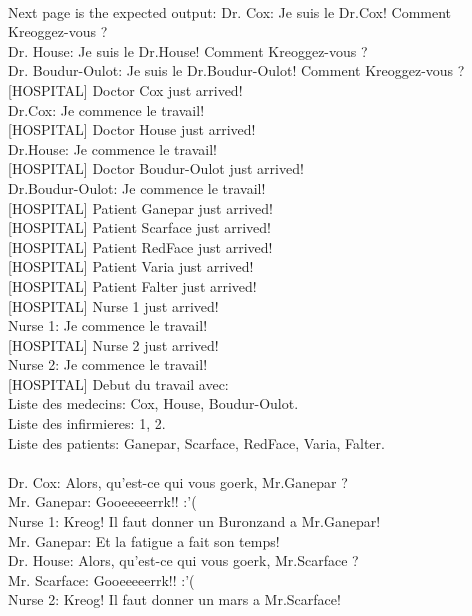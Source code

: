 ~\\
Next page is the expected output:
\newpage
{}
{
  Dr. Cox: Je suis le Dr.Cox! Comment Kreoggez-vous ?\\
  Dr. House: Je suis le Dr.House! Comment Kreoggez-vous ?\\
  Dr. Boudur-Oulot: Je suis le Dr.Boudur-Oulot! Comment Kreoggez-vous ?\\
  {[HOSPITAL]} Doctor Cox just arrived!\\
  Dr.Cox: Je commence le travail!\\
  {[HOSPITAL]} Doctor House just arrived!\\
  Dr.House: Je commence le travail!\\
  {[HOSPITAL]} Doctor Boudur-Oulot just arrived!\\
  Dr.Boudur-Oulot: Je commence le travail!\\
  {[HOSPITAL]} Patient Ganepar just arrived!\\
  {[HOSPITAL]} Patient Scarface just arrived!\\
  {[HOSPITAL]} Patient RedFace just arrived!\\
  {[HOSPITAL]} Patient Varia just arrived!\\
  {[HOSPITAL]} Patient Falter just arrived!\\
  {[HOSPITAL]} Nurse 1 just arrived!\\
  Nurse 1: Je commence le travail!\\
  {[HOSPITAL]} Nurse 2 just arrived!\\
  Nurse 2: Je commence le travail!\\
  {[HOSPITAL]} Debut du travail avec:\\
  Liste des medecins: Cox, House, Boudur-Oulot.\\
  Liste des infirmieres: 1, 2.\\
  Liste des patients: Ganepar, Scarface, RedFace, Varia, Falter.\\
  \\
  Dr. Cox: Alors, qu'est-ce qui vous goerk, Mr.Ganepar ?\\
  Mr. Ganepar: Gooeeeeerrk!! :'(\\
  Nurse 1: Kreog! Il faut donner un Buronzand a Mr.Ganepar!\\
  Mr. Ganepar: Et la fatigue a fait son temps!\\
  Dr. House: Alors, qu'est-ce qui vous goerk, Mr.Scarface ?\\
  Mr. Scarface: Gooeeeeerrk!! :'(\\
  Nurse 2: Kreog! Il faut donner un mars a Mr.Scarface!\\
}
